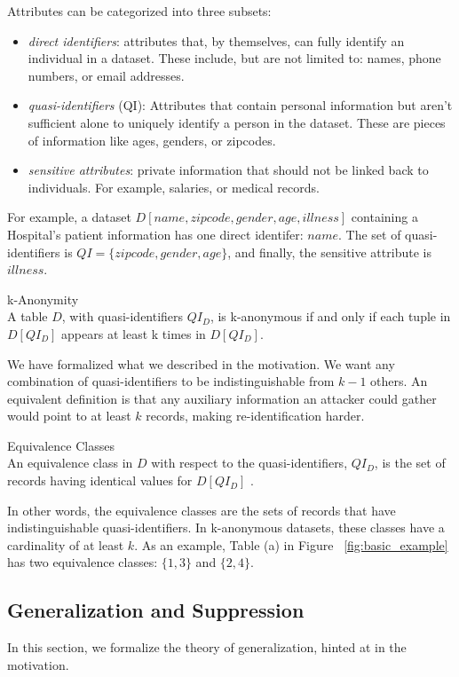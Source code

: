 Attributes can be categorized into three subsets:
\begin{itemize}
    \item \textit{direct identifiers}: attributes that, by themselves, can fully identify an individual in a dataset. These include, but are not limited to: names, phone numbers, or email addresses.
    \item \textit{quasi-identifiers} (QI): Attributes that contain personal information but aren't sufficient alone to uniquely identify a person in the dataset. These are pieces of information like ages, genders, or zipcodes.
    \item \textit{sensitive attributes}: private information that should not be linked back to individuals. For example, salaries, or medical records.
\end{itemize}

For example, a dataset $D[name, zipcode, gender, age, illness]$ containing a Hospital's patient information has one direct identifer: $name$. The set of quasi-identifiers is $QI=\{zipcode, gender, age\}$, and finally, the sensitive attribute is $illness$.

\begin{definition}{k-Anonymity} \\
A table $D$, with quasi-identifiers $QI_D$, is k-anonymous if and only if each tuple in $D[QI_D]$ appears at least k times in $D[QI_D]$.
\end{definition}

We have formalized what we described in the motivation. We want any combination of quasi-identifiers to be indistinguishable from $k-1$ others. An equivalent definition is that any auxiliary information an attacker could gather would point to at least $k$ records, making re-identification harder.

\begin{definition}{Equivalence Classes} \\
An equivalence class in $D$ with respect to the quasi-identifiers, $QI_D$, is the set of records having identical values for $D[QI_D]$ \cite{mondrian}.
\end{definition}

In other words, the equivalence classes are the sets of records that have indistinguishable quasi-identifiers. In k-anonymous datasets, these classes have a cardinality of at least $k$. As an example, Table (a) in Figure ~\ref{fig:basic_example} has two equivalence classes: $\{1,3\}$ and $\{2,4\}$.

\subsection{Generalization and Suppression}
In this section, we formalize the theory of generalization, hinted at in the motivation.

